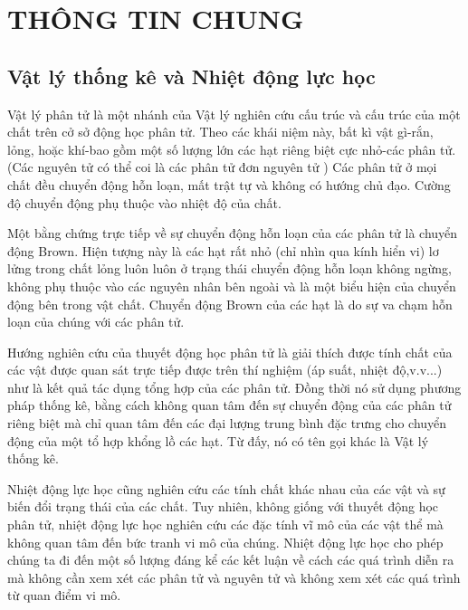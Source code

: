 

\chapter{THÔNG TIN CHUNG}\label{chap:10}

\section{Vật lý thống kê và Nhiệt động lực học}\label{sec:10_1}

Vật lý phân tử là một nhánh của Vật lý nghiên cứu cấu trúc và cấu trúc của một chất trên cở sở động học phân tử. Theo các khái niệm này, bất kì vật gì-rắn, lỏng, hoặc khí-bao gồm một số lượng lớn các hạt riêng biệt cực nhỏ-các phân tử. (Các nguyên tử có thể coi là các phân tử đơn nguyên tử ) Các phân tử ở mọi chất đều chuyển động hỗn loạn, mất trật tự và không có hướng chủ đạo. Cường độ chuyển động phụ thuộc vào nhiệt độ của chất.

Một bằng chứng trực tiếp về sự chuyển động hỗn loạn của các phân tử là chuyển động Brown. Hiện tượng này là các hạt rất nhỏ (chỉ nhìn qua kính hiển vi) lơ lửng trong chất lỏng luôn luôn ở trạng thái chuyển động hỗn loạn không ngừng, không phụ thuộc vào các nguyên nhân bên ngoài và là một biểu hiện của chuyển động bên trong vật chất. Chuyển động Brown của các hạt là do sự va chạm hỗn loạn của chúng với các phân tử.

Hướng nghiên cứu của thuyết động học phân tử là giải thích được tính chất của các vật được quan sát trực tiếp được trên thí nghiệm (áp suất, nhiệt độ,v.v...) như là kết quả tác dụng tổng hợp của các phân tử. Đồng thời nó sử dụng phương pháp thống kê, bằng cách không quan tâm đến sự chuyển động của các phân tử riêng biệt mà chỉ quan tâm đến các đại lượng trung bình đặc trưng cho chuyển động của một tổ hợp khổng lồ các hạt. Từ đấy, nó có tên gọi khác là Vật lý thống kê.

Nhiệt động lực học cũng nghiên cứu các tính chất khác nhau của các vật và sự biến đổi trạng thái của các chất. Tuy nhiên, không giống với thuyết động học phân tử, nhiệt động lực học nghiên cứu các đặc tính vĩ mô của các vật thể mà không quan tâm đến bức tranh vi mô của chúng. Nhiệt động lực học cho phép chúng ta đi đến một số lượng đáng kể các kết luận về cách các quá trình diễn ra mà không cần xem xét các phân tử và nguyên tử và không xem xét các quá trình từ quan điểm vi mô.

